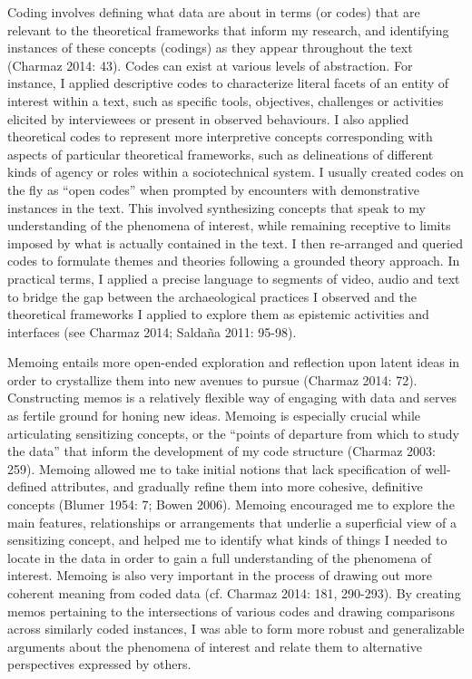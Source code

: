 \documentclass[
]{article}
\begin{document}
Coding involves defining what data are about in terms (or codes) that
are relevant to the theoretical frameworks that inform my research, and
identifying instances of these concepts (codings) as they appear
throughout the text (Charmaz 2014: 43). Codes can exist at various
levels of abstraction. For instance, I applied descriptive codes to
characterize literal facets of an entity of interest within a text, such
as specific tools, objectives, challenges or activities elicited by
interviewees or present in observed behaviours. I also applied
theoretical codes to represent more interpretive concepts corresponding
with aspects of particular theoretical frameworks, such as delineations
of different kinds of agency or roles within a sociotechnical system. I
usually created codes on the fly as ``open codes'' when prompted by
encounters with demonstrative instances in the text. This involved
synthesizing concepts that speak to my understanding of the phenomena of
interest, while remaining receptive to limits imposed by what is
actually contained in the text. I then re-arranged and queried codes to
formulate themes and theories following a grounded theory approach. In
practical terms, I applied a precise language to segments of video,
audio and text to bridge the gap between the archaeological practices I
observed and the theoretical frameworks I applied to explore them as
epistemic activities and interfaces (see Charmaz 2014; Saldaña 2011:
95-98).

Memoing entails more open-ended exploration and reflection upon latent
ideas in order to crystallize them into new avenues to pursue (Charmaz
2014: 72). Constructing memos is a relatively flexible way of engaging
with data and serves as fertile ground for honing new ideas. Memoing is
especially crucial while articulating sensitizing concepts, or the
``points of departure from which to study the data'' that inform the
development of my code structure (Charmaz 2003: 259). Memoing allowed me
to take initial notions that lack specification of well-defined
attributes, and gradually refine them into more cohesive, definitive
concepts (Blumer 1954: 7; Bowen 2006). Memoing encouraged me to explore
the main features, relationships or arrangements that underlie a
superficial view of a sensitizing concept, and helped me to identify
what kinds of things I needed to locate in the data in order to gain a
full understanding of the phenomena of interest. Memoing is also very
important in the process of drawing out more coherent meaning from coded
data (cf. Charmaz 2014: 181, 290-293). By creating memos pertaining to
the intersections of various codes and drawing comparisons across
similarly coded instances, I was able to form more robust and
generalizable arguments about the phenomena of interest and relate them
to alternative perspectives expressed by others.
\end{document}
